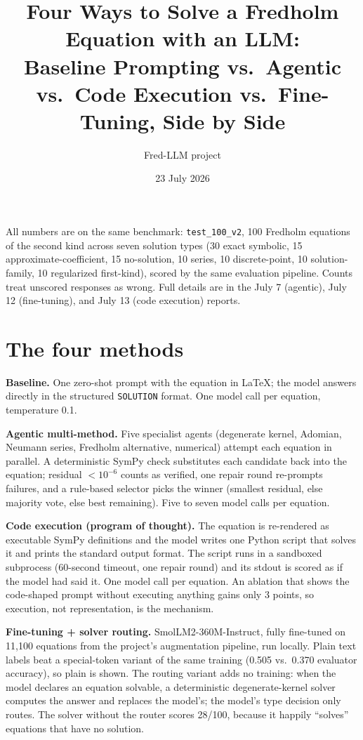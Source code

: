 \documentclass[11pt]{article}
\title{Four Ways to Solve a Fredholm Equation with an LLM:\\
\large Baseline Prompting vs.\ Agentic vs.\ Code Execution vs.\ Fine-Tuning, Side by Side}
\author{Fred-LLM project}
\date{23 July 2026}
\begin{document}
\maketitle

All numbers are on the same benchmark: \texttt{test\_100\_v2}, 100 Fredholm
equations of the second kind across seven solution types (30 exact symbolic,
15 approximate-coefficient, 15 no-solution, 10 series, 10 discrete-point, 10
solution-family, 10 regularized first-kind), scored by the same evaluation
pipeline. Counts treat unscored responses as wrong. Full details are in the
July 7 (agentic), July 12 (fine-tuning), and July 13 (code execution) reports.

\section{The four methods}

\textbf{Baseline.} One zero-shot prompt with the equation in LaTeX; the model
answers directly in the structured \texttt{SOLUTION} format. One model call
per equation, temperature 0.1.

\textbf{Agentic multi-method.} Five specialist agents (degenerate kernel,
Adomian, Neumann series, Fredholm alternative, numerical) attempt each
equation in parallel. A deterministic SymPy check substitutes each candidate
back into the equation; residual $<10^{-6}$ counts as verified, one repair
round re-prompts failures, and a rule-based selector picks the winner
(smallest residual, else majority vote, else best remaining). Five to seven
model calls per equation.

\textbf{Code execution (program of thought).} The equation is re-rendered as
executable SymPy definitions and the model writes one Python script that
solves it and prints the standard output format. The script runs in a
sandboxed subprocess (60-second timeout, one repair round) and its stdout is
scored as if the model had said it. One model call per equation. An ablation
that shows the code-shaped prompt without executing anything gains only 3
points, so execution, not representation, is the mechanism.

\textbf{Fine-tuning + solver routing.} SmolLM2-360M-Instruct, fully
fine-tuned on 11{,}100 equations from the project's augmentation pipeline,
run locally. Plain text labels beat a special-token variant of the same
training (0.505 vs.\ 0.370 evaluator accuracy), so plain is shown. The
routing variant adds no training: when the model declares an equation
solvable, a deterministic degenerate-kernel solver computes the answer and
replaces the model's; the model's type decision only routes. The solver
without the router scores 28/100, because it happily ``solves'' equations
that have no solution.
\end{document}
